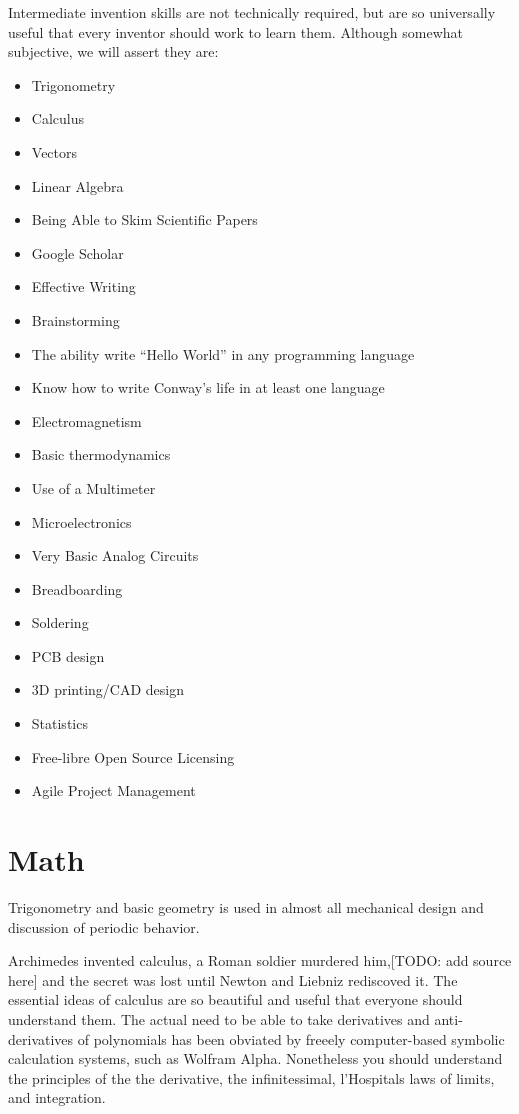 \documentclass[
	fontsize=10pt, %
	twoside=false, %
	secnumdepth=1, %
]{kaobook}
\begin{document}
Intermediate invention skills are not technically required,
but are so universally useful that every inventor should
work to learn them. Although somewhat subjective,
we will assert they are:
\begin{itemize}
\item Trigonometry
\item Calculus
\item Vectors
\item Linear Algebra
\item Being Able to Skim Scientific Papers
\item Google Scholar
\item Effective Writing
\item Brainstorming
\item The ability write “Hello World” in any programming language
\item Know how to write Conway’s life in at least one language
\item Electromagnetism
\item Basic thermodynamics
\item Use of a Multimeter
\item Microelectronics
\item Very Basic Analog Circuits
\item Breadboarding
\item Soldering
\item PCB design
\item 3D printing/CAD design
\item Statistics
\item Free-libre Open Source Licensing
\item Agile Project Management
\end{itemize}


\section{Math}

Trigonometry and basic geometry is used in almost all mechanical
design and discussion of periodic behavior.

Archimedes invented calculus, a Roman soldier murdered him,[TODO: add source here]
and the secret was lost until Newton and Liebniz rediscoved it.
The essential ideas of calculus are so beautiful and useful
that everyone should understand them. The actual need to be
able to take derivatives and anti-derivatives of
polynomials has been obviated by freeely computer-based symbolic
calculation systems, such as Wolfram Alpha.
Nonetheless you should understand the principles of the
the derivative, the infinitessimal, l'Hospitals laws of limits,
and integration.
\end{document}
